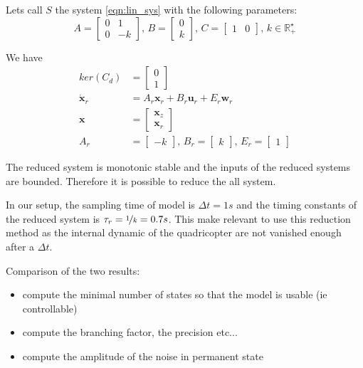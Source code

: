 \documentclass{article}
\theoremstyle{named}
\begin{document}
Lets call $S$ the system \ref{eqn:lin_sys} with the following parameters:
\begin{equation*}\label{eqn:sec_int_reduced}
A = \begin{bmatrix}
0 & 1\\ 
0 & -k
\end{bmatrix}
\textrm{, }
B = \begin{bmatrix}
0 \\ 
k 
\end{bmatrix}
\textrm{, }
C = \begin{bmatrix}
1 & 0
\end{bmatrix}
\textrm{, }
k \in \mathbb{R}_+^\star
\end{equation*}

We have
\begin{align*}
ker(C_d) &=  \begin{bmatrix}
0\\ 
1
\end{bmatrix}\\
\dot{\mathbf{x}}_r &= A_r \mathbf{x}_r + B_r \mathbf{u}_r + E_r \mathbf{w}_r\\
\mathbf{x} &= \begin{bmatrix}
\mathbf{x}_z\\
\mathbf{x}_r
\end{bmatrix}\\
A_r &= \begin{bmatrix}
-k
\end{bmatrix}
\textrm{, }
B_r = \begin{bmatrix}
k
\end{bmatrix}
\textrm{, }
E_r = \begin{bmatrix}
1
\end{bmatrix}
\end{align*}


The reduced system is monotonic stable and the inputs of the reduced systems are bounded. Therefore it is possible to reduce the all system.

In our setup, the sampling time of model is ${\Delta t = 1s}$ and the timing constants of the reduced system is $\tau_r = {\nicefrac{1}{k} = 0.7s}$. This make relevant to use this reduction method as the internal dynamic of the quadricopter are not vanished enough after a $\Delta t$.


Comparison of the two results:
\begin{itemize}
\item compute the minimal number of states so that the model is usable (ie controllable)
\item compute the branching factor, the precision etc...
\item compute the amplitude of the noise in permanent state
\end{itemize}
\end{document}
